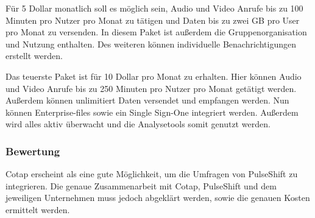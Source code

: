 Für 5 Dollar monatlich soll es möglich sein, Audio und Video Anrufe bis zu 100 Minuten pro Nutzer pro Monat zu tätigen und Daten bis zu zwei GB pro User pro Monat zu versenden. In diesem Paket ist außerdem die Gruppenorganisation und Nutzung enthalten. Des weiteren können individuelle Benachrichtigungen erstellt werden.

Das teuerste Paket ist für 10 Dollar pro Monat zu erhalten. Hier können Audio und Video Anrufe bis zu 250 Minuten pro Nutzer pro Monat getätigt werden. Außerdem können unlimitiert Daten versendet und empfangen werden. Nun können Enterprise-files sowie ein Single Sign-One integriert werden. Außerdem wird alles aktiv überwacht und die Analysetools somit genutzt werden.

\subsubsection{Bewertung}
Cotap erscheint als eine gute Möglichkeit, um die Umfragen von PulseShift zu integrieren. Die genaue Zusammenarbeit mit Cotap, PulseShift und dem jeweiligen Unternehmen muss jedoch abgeklärt werden, sowie die genauen Kosten ermittelt werden.
